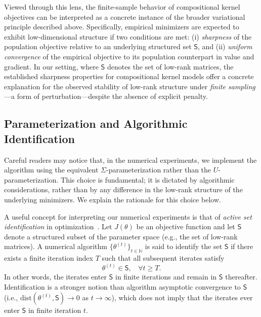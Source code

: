 \documentclass[sn-mathphys-num]{sn-jnl}%
\numberwithin{equation}{section}
\newcommand{\N}{\mathbb{N}}
\theoremstyle{thmstyleone}%
\theoremstyle{thmstyletwo}%
\theoremstyle{thmstylethree}%
\begin{document}
Viewed through this lens, the finite-sample behavior of compositional kernel objectives can be interpreted as a concrete instance of the broader variational principle described above. Specifically, empirical minimizers are expected to exhibit low-dimensional structure if two conditions are met: (i) \emph{sharpness} of the population objective relative to an underlying structured set $\mathsf{S}$, and (ii) \emph{uniform convergence} of the empirical objective to its population counterpart in value and gradient. In our setting, where $\mathsf{S}$ denotes the set of low-rank matrices, the established sharpness properties for compositional kernel models offer a concrete explanation for the observed stability of low-rank structure under \emph{finite sampling}---a form of perturbation---despite the absence of explicit penalty.


\subsection{Parameterization and Algorithmic Identification}
\indent\indent
Careful readers may notice that, in the numerical experiments, we implement the algorithm using the equivalent $\Sigma$-parameterization rather than the $U$-parameterization. This choice is fundamental; it is dictated by algorithmic considerations, rather than by any difference in the low-rank structure of the underlying minimizers. We explain the rationale for this choice below.

A useful concept for interpreting our numerical experiments is that of \emph{active set identification} in optimization~\cite{Bertsekas03, FacchineiFiKa98, OberlinWr06}. Let $J(\theta)$ be an objective function and let $\mathsf{S}$ denote a structured subset of the parameter space (e.g., the set of low-rank matrices). A numerical algorithm $\{\theta^{(t)}\}_{t\in \N}$ is said to identify the set $\mathsf{S}$ if there exists a finite iteration index $T$ such that all subsequent iterates satisfy
\begin{equation*}
	\theta^{(t)} \in \mathsf{S},~~~~\forall t\ge T. 
\end{equation*}
In other words, the iterates enter $\mathsf{S}$ in finite iterations and remain in $\mathsf{S}$ thereafter. Identification is a stronger notion than algorithm asymptotic convergence to $\mathsf{S}$ (i.e., $\mathrm{dist}(\theta^{(t)},\mathsf{S}) \to 0$ as $t \to \infty$), which does not imply that the iterates ever enter $\mathsf{S}$ in finite iteration $t$. 
\end{document}
